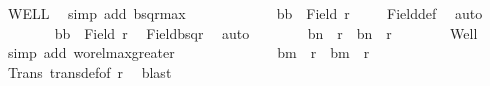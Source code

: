 \begin{isabellebody}
\ WELL\ \isamarkupfalse%
\ {\isacharparenleft}{\kern0pt}simp\ add{\isacharcolon}{\kern0pt}\ bsqr{\isacharunderscore}{\kern0pt}max{}{\isacharparenright}{\kern0pt}\isanewline
\ \ \ \ \ \isamarkupfalse%
\isanewline
\ \ \ \ \ \isacommand{{\isacharbraceleft}{\kern0pt}}\isamarkupfalse%
\isamarkupfalse%
\ {\isachardoublequoteopen}{\isacharparenleft}{\kern0pt}b{}{\isacharcomma}{\kern0pt}b{}{\isacharparenright}{\kern0pt}\ {\isasymin}\ Field\ {\isacharquery}{\kern0pt}r{\isacharprime}{\kern0pt}{\isachardoublequoteclose}\ \isamarkupfalse%
\ {}\ \isamarkupfalse%
\ Field{\isacharunderscore}{\kern0pt}def\ \isamarkupfalse%
\ auto\isanewline
\ \ \ \ \ \ \isamarkupfalse%
\ {\isachardoublequoteopen}{\isacharbraceleft}{\kern0pt}b{}{\isacharcomma}{\kern0pt}b{}{\isacharbraceright}{\kern0pt}\ {\isasymle}\ Field\ r{\isachardoublequoteclose}\ \isamarkupfalse%
\ Field{\isacharunderscore}{\kern0pt}bsqr\ \isamarkupfalse%
\ auto\isanewline
\ \ \ \ \ \ \isamarkupfalse%
\ {\isachardoublequoteopen}{\isacharparenleft}{\kern0pt}b{}{\isacharcomma}{\kern0pt}{\isacharquery}{\kern0pt}n{\isacharparenright}{\kern0pt}\ {\isasymin}\ r\ {\isasymand}\ {\isacharparenleft}{\kern0pt}b{}{\isacharcomma}{\kern0pt}{\isacharquery}{\kern0pt}n{\isacharparenright}{\kern0pt}\ {\isasymin}\ r{\isachardoublequoteclose}\isanewline
\ \ \ \ \ \ \isamarkupfalse%
\ Well\ \isamarkupfalse%
\ {\isacharparenleft}{\kern0pt}simp\ add{\isacharcolon}{\kern0pt}\ wo{\isacharunderscore}{\kern0pt}rel{\isachardot}{\kern0pt}max{}{\isacharunderscore}{\kern0pt}greater{\isacharparenright}{\kern0pt}\isanewline
\ \ \ \ \ \isacommand{{\isacharbraceright}{\kern0pt}}\isamarkupfalse%
\isanewline
\ \ \ \ \ \isamarkupfalse%
\ \isamarkupfalse%
\ {\isachardoublequoteopen}{\isacharparenleft}{\kern0pt}b{}{\isacharcomma}{\kern0pt}{\isacharquery}{\kern0pt}m{\isacharparenright}{\kern0pt}\ {\isasymin}\ r\ {\isasymand}\ {\isacharparenleft}{\kern0pt}b{}{\isacharcomma}{\kern0pt}{\isacharquery}{\kern0pt}m{\isacharparenright}{\kern0pt}\ {\isasymin}\ r{\isachardoublequoteclose}\isanewline
\ \ \ \ \ \isamarkupfalse%
\ Trans\ trans{\isacharunderscore}{\kern0pt}def{\isacharbrackleft}{\kern0pt}of\ r{\isacharbrackright}{\kern0pt}\ \isamarkupfalse%
\ blast\isanewline

\end{isabellebody}
